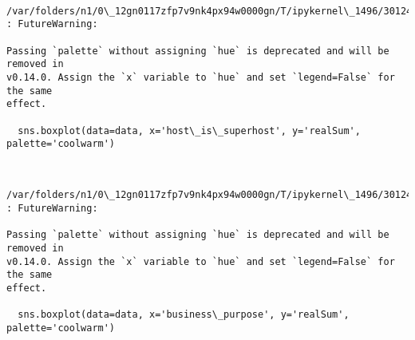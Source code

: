 \documentclass[11pt]{article}
\makeatletter
\newcommand{\boxspacing}{\kern\kvtcb@left@rule\kern\kvtcb@boxsep}
\newcommand{\prompt}[4]{
        {\ttfamily\llap{{\color{#2}[#3]:\hspace{3pt}#4}}\vspace{-\baselineskip}}
    }
\makeatother
\begin{document}
    \begin{center}
    \end{center}
    { \hspace*{\fill} \\}
    
    \begin{Verbatim}[commandchars=\\\{\}]
/var/folders/n1/0\_12gn0117zfp7v9nk4px94w0000gn/T/ipykernel\_1496/3012437300.py:18
: FutureWarning:

Passing `palette` without assigning `hue` is deprecated and will be removed in
v0.14.0. Assign the `x` variable to `hue` and set `legend=False` for the same
effect.

  sns.boxplot(data=data, x='host\_is\_superhost', y='realSum', palette='coolwarm')
    \end{Verbatim}

    \begin{center}
    \end{center}
    { \hspace*{\fill} \\}
    
    \begin{Verbatim}[commandchars=\\\{\}]
/var/folders/n1/0\_12gn0117zfp7v9nk4px94w0000gn/T/ipykernel\_1496/3012437300.py:26
: FutureWarning:

Passing `palette` without assigning `hue` is deprecated and will be removed in
v0.14.0. Assign the `x` variable to `hue` and set `legend=False` for the same
effect.

  sns.boxplot(data=data, x='business\_purpose', y='realSum', palette='coolwarm')
    \end{Verbatim}

    \begin{center}
    \end{center}
    { \hspace*{\fill} \\}
    
    \begin{tcolorbox}[breakable, size=fbox, boxrule=1pt, pad at break*=1mm,colback=cellbackground, colframe=cellborder]
\prompt{In}{incolor}{ }{\boxspacing}
\begin{Verbatim}[commandchars=\\\{\}]

\end{Verbatim}
\end{tcolorbox}
\end{document}
